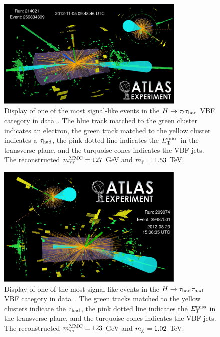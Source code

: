 \begin{figure}[tp]
  \centering
  \includegraphics[width=0.80\textwidth]{figures/HIGG-2013-32/figaux_19}
  \caption{Display of one of the most signal-like events in the $H\rightarrow\tau_\ell\tau_\text{had}$ VBF category in data~\cite{HIGG-2013-32}. The blue track matched to the green cluster indicates an electron, the green track matched to the yellow cluster indicates a $\tau_\text{had}$, the pink dotted line indicates the $E_{\mathrm{T}}^{\mathrm{miss}}$ in the transverse plane, and the turquoise cones indicates the VBF jets. The reconstructed $m_{\tau\tau}^\text{MMC} = 127$ GeV and $m_{\text{jj}} = 1.53$ TeV.}
  \label{fig:results-eventdisplay-lh}
\end{figure}

\begin{figure}[tp]
  \centering
  \includegraphics[width=0.80\textwidth]{figures/HIGG-2013-32/figaux_20}
  \caption{Display of one of the most signal-like events in the $H\rightarrow\tau_\text{had}\tau_\text{had}$ VBF category in data~\cite{HIGG-2013-32}. The green tracks matched to the yellow clusters indicate the $\tau_\text{had}$, the pink dotted line indicates the $E_{\mathrm{T}}^{\mathrm{miss}}$ in the transverse plane, and the turquoise cones indicates the VBF jets. The reconstructed $m_{\tau\tau}^\text{MMC} = 123$ GeV and $m_{\text{jj}} = 1.02$ TeV.}
  \label{fig:results-eventdisplay-hh}
\end{figure}

